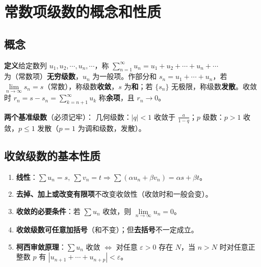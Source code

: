 
\section{常数项级数的概念和性质}
\subsection{概念}

\textbf{定义}\quad 给定数列 $u_1,u_2,\cdots,u_n,\cdots$，称 $\sum\limits_{n=1}^{\infty}u_n=u_1+u_2+\cdots+u_n+\cdots$ 为（常数项）\textbf{无穷级数}，$u_n$ 为一般项。作部分和 $s_n=u_1+\cdots+u_n$，若 $\lim\limits_{n\to\infty}s_n=s$（常数），称级数\textbf{收敛}，$s$ 为\textbf{和}；若 $\{s_n\}$ 无极限，称级数\textbf{发散}。收敛时 $r_n=s-s_n=\sum\limits_{k=n+1}^{\infty}u_k$ 称\textbf{余项}，且 $r_n\to0$。

\textbf{两个基准级数}（必须记牢）：
几何级数：$|q|<1$ 收敛于 $\frac{a}{1-q}$；$p$ 级数：$p>1$ 收敛，$p\le1$ 发散（$p=1$ 为调和级数，发散）。

\subsection{收敛级数的基本性质}

\begin{enumerate}
  \item \textbf{线性}：$\sum u_n=s,\ \sum v_n=t\Rightarrow\sum(\alpha u_n+\beta v_n)=\alpha s+\beta t$。
  \item \textbf{去掉、加上或改变有限项}不改变收敛性（收敛时和一般会变）。
  \item \textbf{收敛的必要条件}：若 $\sum u_n$ 收敛，则 $\lim\limits_{n\to\infty}u_n=0$。
  \item \textbf{收敛级数可任意加括号}（和不变）；但\textbf{去括号}不一定成立。
  \item \textbf{柯西审敛原理}：$\sum u_n$ 收敛 $\iff$ 对任意 $\varepsilon>0$ 存在 $N$，当 $n>N$ 时对任意正整数 $p$ 有 $|u_{n+1}+\cdots+u_{n+p}|<\varepsilon$。
\end{enumerate}

